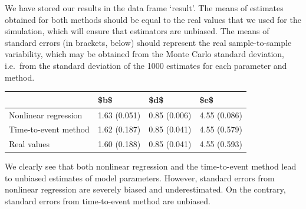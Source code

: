 \documentclass[
]{book}
\newenvironment{Shaded}{\begin{snugshade}}{\end{snugshade}}
\newcommand{\ControlFlowTok}[1]{\textcolor[rgb]{0.13,0.29,0.53}{\textbf{#1}}}
\newcommand{\DecValTok}[1]{\textcolor[rgb]{0.00,0.00,0.81}{#1}}
\newcommand{\FloatTok}[1]{\textcolor[rgb]{0.00,0.00,0.81}{#1}}
\newcommand{\FunctionTok}[1]{\textcolor[rgb]{0.00,0.00,0.00}{#1}}
\newcommand{\NormalTok}[1]{#1}
\newcommand{\OtherTok}[1]{\textcolor[rgb]{0.56,0.35,0.01}{#1}}
\newcommand{\SpecialCharTok}[1]{\textcolor[rgb]{0.00,0.00,0.00}{#1}}
\newcommand{\StringTok}[1]{\textcolor[rgb]{0.31,0.60,0.02}{#1}}
\begin{document}
\begin{Shaded}
\end{Shaded}

We have stored our results in the data frame `result'. The means of estimates obtained for both methods should be equal to the real values that we used for the simulation, which will ensure that estimators are unbiased. The means of standard errors (in brackets, below) should represent the real sample-to-sample variability, which may be obtained from the Monte Carlo standard deviation, i.e.~from the standard deviation of the 1000 estimates for each parameter and method.

\begin{tabular}{l|l|l|l}
\hline
  & \$b\$ & \$d\$ & \$e\$\\
\hline
Nonlinear regression & 1.63 (0.051) & 0.85 (0.006) & 4.55 (0.086)\\
\hline
Time-to-event method & 1.62 (0.187) & 0.85 (0.041) & 4.55 (0.579)\\
\hline
Real values & 1.60 (0.188) & 0.85 (0.041) & 4.55 (0.593)\\
\hline
\end{tabular}

We clearly see that both nonlinear regression and the time-to-event method lead to unbiased estimates of model parameters. However, standard errors from nonlinear regression are severely biased and underestimated. On the contrary, standard errors from time-to-event method are unbiased.
\end{document}
